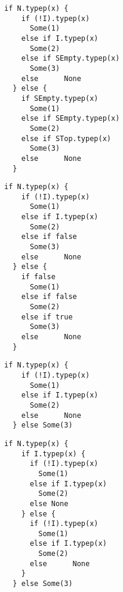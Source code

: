 \newsavebox\typecaseDbox
\begin{lrbox}{\typecaseDbox}
  \begin{minipage}{8cm}
\begin{lstlisting}[style=scalaioScala]
  if N.typep(x) {
    if (!I).typep(x)
      Some(1)
    else if I.typep(x)
      Some(2)
    else if SEmpty.typep(x)
      Some(3)
    else      None
  } else {
    if SEmpty.typep(x)
      Some(1)
    else if SEmpty.typep(x)
      Some(2)
    else if STop.typep(x)
      Some(3)
    else      None
  }
\end{lstlisting}
  \end{minipage}
\end{lrbox}

\newsavebox\typecaseEbox
\begin{lrbox}{\typecaseEbox}
  \begin{minipage}{8cm}
\begin{lstlisting}[style=scalaioScala]
  if N.typep(x) {
    if (!I).typep(x)
      Some(1)
    else if I.typep(x)
      Some(2)
    else if false
      Some(3)
    else      None
  } else {
    if false
      Some(1)
    else if false
      Some(2)
    else if true
      Some(3)
    else      None
  }
\end{lstlisting}
  \end{minipage}
\end{lrbox}

\newsavebox\typecaseFbox
\begin{lrbox}{\typecaseFbox}
  \begin{minipage}{8cm}
\begin{lstlisting}[style=scalaioScala]
  if N.typep(x) {
    if (!I).typep(x)
      Some(1)
    else if I.typep(x)
      Some(2)
    else      None
  } else Some(3)
\end{lstlisting}
  \end{minipage}
\end{lrbox}

\newsavebox\typecaseGbox
\begin{lrbox}{\typecaseGbox}
  \begin{minipage}{8cm}
\begin{lstlisting}[style=scalaioScala]
  if N.typep(x) {
    if I.typep(x) {
      if (!I).typep(x)
        Some(1)
      else if I.typep(x)
        Some(2)
      else None
    } else {
      if (!I).typep(x)
        Some(1)
      else if I.typep(x)
        Some(2)
      else      None
    }
  } else Some(3)
\end{lstlisting}
  \end{minipage}
\end{lrbox}

